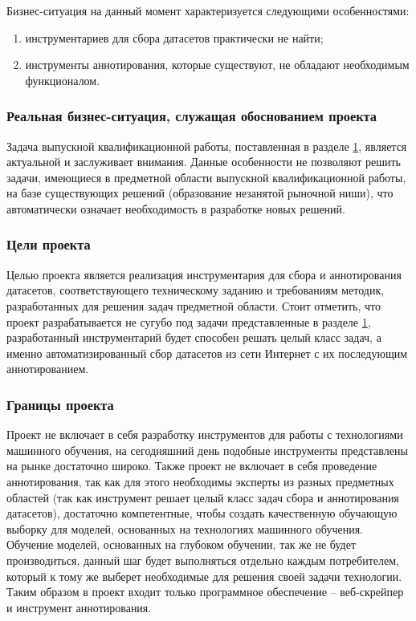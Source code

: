 \documentclass[../main]{subfiles}
\begin{document}
Бизнес-ситуация на данный момент характеризуется следующими особенностями:
\begin{enumerate}
    \item инструментариев для сбора датасетов практически не найти;
    \item инструменты аннотирования, которые существуют, не обладают необходимым функционалом.
\end{enumerate}

\subsubsection{Реальная бизнес-ситуация, служащая обоснованием проекта}
Задача выпускной квалификационной работы, поставленная в разделе \hyperref[sec:subject_domain]{1}, является актуальной и заслуживает внимания. Данные особенности не позволяют решить задачи, имеющиеся в предметной области выпускной квалификационной работы, на базе существующих решений (образование незанятой рыночной ниши), что автоматически означает необходимость в разработке новых решений. 

\subsubsection{Цели проекта}
Целью проекта является реализация инструментария для сбора и аннотирования датасетов, соответствующего техническому заданию и требованиям методик, разработанных для решения задач предметной области. Стоит отметить, что проект разрабатывается не сугубо под задачи представленные в разделе \hyperref[sec:subject_domain]{1}, разработанный инструментарий будет способен решать целый класс задач, а именно автоматизированный сбор датасетов из сети Интернет с их последующим аннотированием. 

\subsubsection{Границы проекта}
Проект не включает в себя разработку инструментов для работы с технологиями машинного обучения, на сегодняшний день подобные инструменты представлены на рынке достаточно широко. Также проект не включает в себя проведение аннотирования, так как для этого необходимы эксперты из разных предметных областей (так как инструмент решает целый класс задач сбора и аннотирования датасетов), достаточно компетентные, чтобы создать качественную обучающую выборку для моделей, основанных на технологиях машинного обучения. Обучение моделей, основанных на глубоком обучении, так же не будет производиться, данный шаг будет выполняться отдельно каждым потребителем, который к тому же выберет необходимые для решения своей задачи технологии. Таким образом в проект входит только программное обеспечение -- веб-скрейпер и инструмент аннотирования.
\end{document}
